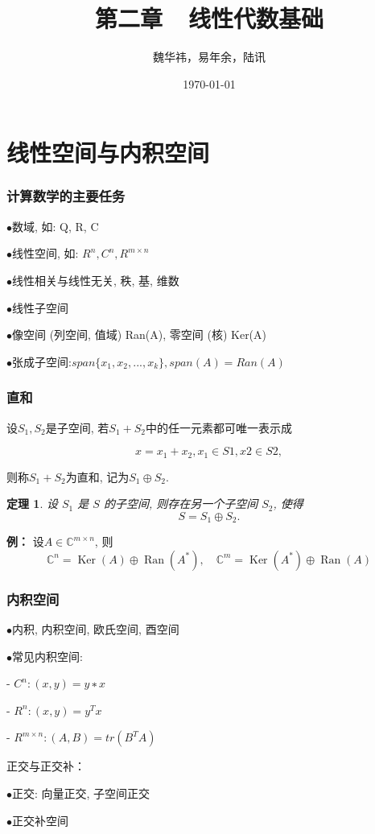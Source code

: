 \documentclass[notheorems,serif]{beamer}
\newcommand{\hei}[1]{{\HEI#1}}
\newtheorem{theorem}{\hei{定理}}
\begin{document}
\title[]{第二章~~线性代数基础}

\author[]{魏华祎，易年余，陆讯}


\date{\today}


\frame[plain]{\titlepage}



\section{线性空间与内积空间}
\begin{frame}
\frametitle{计算数学的主要任务}
$\bullet$数域, 如: Q, R, C

$\bullet$线性空间, 如: $R^n,C^n,R^{m \times n}$

$\bullet$线性相关与线性无关, 秩, 基, 维数

$\bullet$线性子空间

$\bullet$像空间 (列空间, 值域) Ran(A), 零空间 (核) Ker(A)

$\bullet$张成子空间:$span\{x_1, x_2, . . . , x_k\}, span(A) = Ran(A)$
\end{frame}

\begin{frame}
\frametitle{直和}
设$S_1, S_2$是子空间, 若$S_1 + S_2$中的任一元素都可唯一表示成

$$x = x_1 + x_2, x_1 \in S1, x2 \in S2,$$

则称$S_1 + S_2$为直和, 记为$S_1 \oplus S_2$.


\begin{theorem}
	
	设 $S_1$ 是 $S$ 的子空间, 则存在另一个子空间 $S_2$, 使得$$S = S_1 \oplus S_2.$$
	
\end{theorem}

{\bfseries  例：} \quad 设$A \in \mathbb{C}^{m \times n}$, 则
$$\mathbb{C}^{n}=\operatorname{Ker}(A) \oplus \operatorname{Ran}\left(A^{*}\right), \quad \mathbb{C}^{m}=\operatorname{Ker}\left(A^{*}\right) \oplus \operatorname{Ran}(A)$$ 
\end{frame}

\begin{frame}
\frametitle{内积空间}
\qquad$\bullet$内积, 内积空间, 欧氏空间, 酉空间
 
\qquad$\bullet$常见内积空间:
 
 \qquad\qquad - $C^{n} : (x, y) = y∗x$
 
 \qquad\qquad - $R^{n} : (x, y) = y^{T}x$
 
 \qquad\qquad - $R^{m \times n} : (A, B) = tr(B^{T}A)$
 
 正交与正交补：
 
\qquad$\bullet$正交: 向量正交, 子空间正交
 
\qquad$\bullet$正交补空间
\end{frame}
\end{document}
